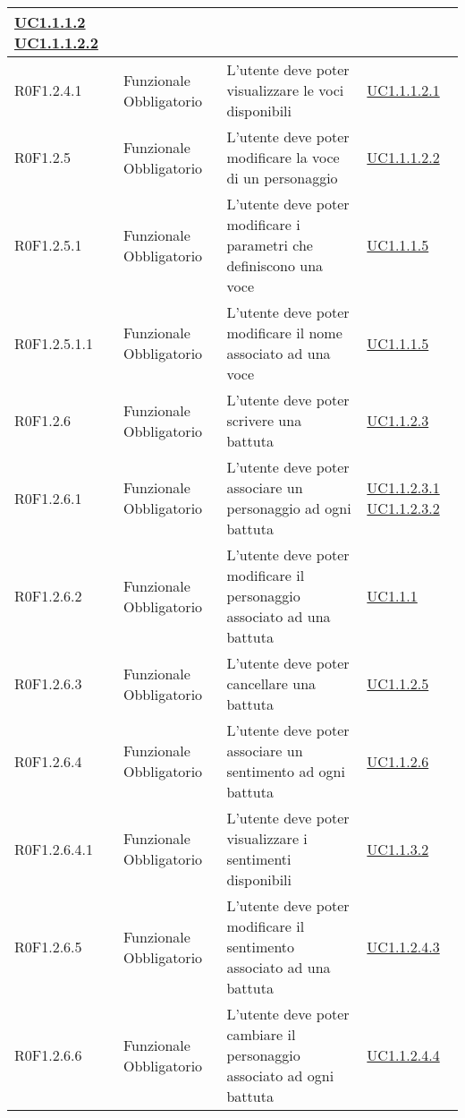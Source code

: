 \begin{center}
\begin{longtable}{| p{2.5cm} | p{3cm} | p{5.25cm} | p{2cm} |}
\hyperref[sec:UC1.1.1.2]{ UC1.1.1.2 } \newline \hyperref[sec:UC1.1.1.2.2]{ UC1.1.1.2.2 }  \\ \hline  R0F1.2.4.1 & Funzionale \newline Obbligatorio & L'utente deve poter visualizzare le voci disponibili  &  \hyperref[sec:UC1.1.1.2.1]{ UC1.1.1.2.1 }  \\ \hline  R0F1.2.5 & Funzionale \newline Obbligatorio & L'utente deve poter modificare la voce di un personaggio &  \hyperref[sec:UC1.1.1.2.2]{ UC1.1.1.2.2 }  \\ \hline  R0F1.2.5.1 & Funzionale \newline Obbligatorio & L'utente deve poter modificare i parametri che definiscono una voce &  \hyperref[sec:UC1.1.1.5]{ UC1.1.1.5 }  \\ \hline  R0F1.2.5.1.1 & Funzionale \newline Obbligatorio & L'utente deve poter modificare il nome associato ad una voce &  \hyperref[sec:UC1.1.1.5]{ UC1.1.1.5 }  \\ \hline  R0F1.2.6 & Funzionale \newline Obbligatorio & L'utente deve poter scrivere una battuta &  \hyperref[sec:UC1.1.2.3]{ UC1.1.2.3 }  \\ \hline  R0F1.2.6.1 & Funzionale \newline Obbligatorio & L'utente deve poter associare un personaggio ad ogni battuta &  \hyperref[sec:UC1.1.2.3.1]{ UC1.1.2.3.1 } \newline \hyperref[sec:UC1.1.2.3.2]{ UC1.1.2.3.2 }  \\ \hline  R0F1.2.6.2 & Funzionale \newline Obbligatorio & L'utente deve poter modificare il personaggio associato ad una battuta &  \hyperref[sec:UC1.1.1]{ UC1.1.1 }  \\ \hline  R0F1.2.6.3 & Funzionale \newline Obbligatorio & L'utente deve poter cancellare una battuta &  \hyperref[sec:UC1.1.2.5]{ UC1.1.2.5 }  \\ \hline  R0F1.2.6.4 & Funzionale \newline Obbligatorio & L'utente deve poter associare un sentimento ad ogni battuta  &  \hyperref[sec:UC1.1.2.6]{ UC1.1.2.6 }  \\ \hline  R0F1.2.6.4.1 & Funzionale \newline Obbligatorio & L'utente deve poter visualizzare i sentimenti disponibili &  \hyperref[sec:UC1.1.3.2]{ UC1.1.3.2 }  \\ \hline  R0F1.2.6.5 & Funzionale \newline Obbligatorio & L'utente deve poter modificare il sentimento associato ad una battuta &  \hyperref[sec:UC1.1.2.4.3]{ UC1.1.2.4.3 }  \\ \hline  R0F1.2.6.6 & Funzionale \newline Obbligatorio & L'utente deve poter cambiare il personaggio associato ad ogni battuta &  \hyperref[sec:UC1.1.2.4.4]{ UC1.1.2.4.4 }  \\ \hline  
\end{longtable}
\end{center}
